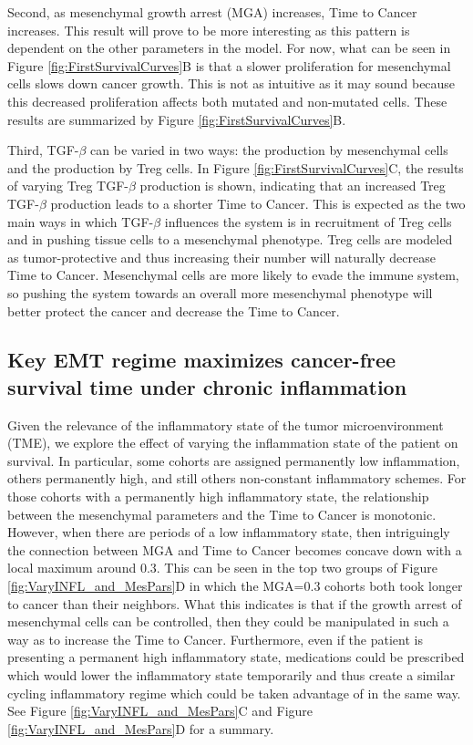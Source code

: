 \documentclass{article}
\begin{document}
Second, as mesenchymal growth arrest (MGA) increases, Time to Cancer increases.
This result will prove to be more interesting as this pattern is dependent on the other parameters in the model.
For now, what can be seen in Figure \ref{fig:FirstSurvivalCurves}B is that a slower proliferation for mesenchymal cells slows down cancer growth.
This is not as intuitive as it may sound because this decreased proliferation affects both mutated and non-mutated cells.
These results are summarized by Figure \ref{fig:FirstSurvivalCurves}B.

Third, TGF-$\beta$ can be varied in two ways: the production by mesenchymal cells and the production by Treg cells.
In Figure \ref{fig:FirstSurvivalCurves}C, the results of varying Treg TGF-$\beta$ production is shown, indicating that an increased Treg TGF-$\beta$ production leads to a shorter Time to Cancer.
This is expected as the two main ways in which TGF-$\beta$ influences the system is in recruitment of Treg cells and in pushing tissue cells to a mesenchymal phenotype.
Treg cells are modeled as tumor-protective and thus increasing their number will naturally decrease Time to Cancer.
Mesenchymal cells are more likely to evade the immune system, so pushing the system towards an overall more mesenchymal phenotype will better protect the cancer and decrease the Time to Cancer.

\subsection{Key EMT regime maximizes cancer-free survival time under chronic inflammation}\label{KeyEMT}
Given the relevance of the inflammatory state of the tumor microenvironment (TME), we explore the effect of varying the inflammation state of the patient on survival.
In particular, some cohorts are assigned permanently low inflammation, others permanently high, and still others non-constant inflammatory schemes.
For those cohorts with a permanently high inflammatory state, the relationship between the mesenchymal parameters and the Time to Cancer is monotonic.
However, when there are periods of a low inflammatory state, then intriguingly the connection between MGA and Time to Cancer becomes concave down with a local maximum around 0.3.
This can be seen in the top two groups of Figure \ref{fig:VaryINFL_and_MesPars}D in which the MGA=0.3 cohorts both took longer to cancer than their neighbors.
What this indicates is that if the growth arrest of mesenchymal cells can be controlled, then they could be manipulated in such a way as to increase the Time to Cancer.
Furthermore, even if the patient is presenting a permanent high inflammatory state, medications could be prescribed which would lower the inflammatory state temporarily and thus create a similar cycling inflammatory regime which could be taken advantage of in the same way.
See Figure \ref{fig:VaryINFL_and_MesPars}C and Figure \ref{fig:VaryINFL_and_MesPars}D for a summary.
\end{document}

